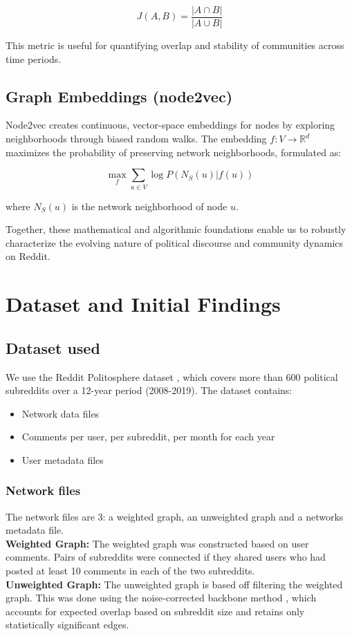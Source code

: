 \documentclass{article}
\begin{document}
$$
J(A,B) = \frac{|A \cap B|}{|A \cup B|}
$$

This metric is useful for quantifying overlap and stability of communities across time periods.

\subsection{Graph Embeddings (node2vec)}
Node2vec creates continuous, vector-space embeddings for nodes by exploring neighborhoods through biased random walks. The embedding $f: V \to \mathbb{R}^d$ maximizes the probability of preserving network neighborhoods, formulated as:

$$
\max_f \sum_{u \in V} \log P(N_S(u)|f(u))
$$

where $N_S(u)$ is the network neighborhood of node $u$.

Together, these mathematical and algorithmic foundations enable us to robustly characterize the evolving nature of political discourse and community dynamics on Reddit.


\section{Dataset and Initial Findings}
\subsection{Dataset used}
We use the Reddit Politosphere dataset \cite{hofmann2022politosphere}, which covers more than 600 political subreddits over a 12-year period (2008-2019). The dataset contains:
\begin{itemize}
    \item Network data files
    \item Comments per user, per subreddit, per month for each year
    \item User metadata files
\end{itemize}

\subsubsection{Network files}
The network files are 3: a weighted graph, an unweighted graph and a networks metadata file.
\newline
\\
\textbf{Weighted Graph:} 
\newline
The weighted graph was constructed based on user comments. Pairs of subreddits were connected if they shared users who had posted at least 10 comments in each of the two subreddits.
\newline
\\
\textbf{Unweighted Graph:} 
\newline
The unweighted graph is based off filtering the weighted graph. This was done using the noise-corrected backbone method \cite{backbone}, which accounts for expected overlap based on subreddit size and retains only statistically significant edges.
\end{document}
